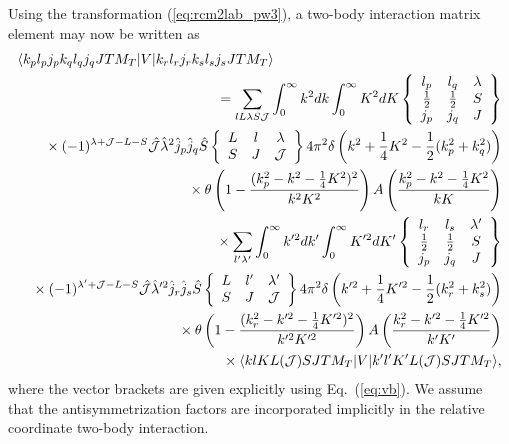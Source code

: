 \documentclass[a4paper,12pt]{report}
\begin{document}
Using the transformation (\ref{eq:rcm2lab_pw3}), a 
two-body interaction matrix element may now be written
as 
\begin{eqnarray} \label{eq:int_v_relcm2lab}
  \lefteqn{  \langle k_{p}l_{p}j_{p}k_{q}l_{q}j_{q}JTM_{T}|
  V|k_{r}l_{r}j_{r}k_{s}l_{s}j_{s}JTM_{T}\rangle } \nonumber \\
  & & {} =\sum_{l L \lambda S \mathcal{J}}\int_{0}^{\infty } k^{2}dk 
  \int_{0}^{\infty } K^{2}dK 
  \left\{ \begin{array}{ccc}
    l_{p} & l_{q} & \lambda \\
    \frac{1}{2} & \frac{1}{2} & S \\
    j_{p} & j_{q} & J 
  \end{array} \right\} \nonumber \\
  & & {} \times (-1)^{\lambda +\mathcal{J}-L-S}
  \hat{\mathcal{J}}\hat{\lambda }^{2}\hat{j}_{p}
  \hat{j}_{q}\hat{S} \left\{ 
  \begin{array}{ccc}
    L & l & \lambda \\
    S & J & \mathcal{J} 
  \end{array} \right\} 
  4\pi^{2}\delta\left( k^{2}+\frac{1}{4}K^{2}
  -\frac{1}{2}(k_{p}^{2}+k_{q}^{2})\right) \nonumber \\
  & & {} \times \theta \left( 1-\frac{(k_{p}^{2}-k^{2}
    -\frac{1}{4}K^{2})^{2}}{k^{2}K^{2}}\right)A
  \left( \frac{k_{p}^{2}-k^{2}-\frac{1}{4}K^{2}}{kK}\right) 
  \nonumber \\
  & & {} \times \sum_{l' \lambda' }\int_{0}^{\infty } 
  k'^{2}dk' \int_{0}^{\infty } K'^{2}dK' 
  \left\{ \begin{array}{ccc}
    l_{r} & l_{s} & \lambda ' \\
    \frac{1}{2} & \frac{1}{2} & S \\
    j_{p} & j_{q} & J 
  \end{array} \right\} \nonumber \\
    & & {} \times (-1)^{\lambda' +\mathcal{J}-L-S}
  \hat{\mathcal{J}}\hat{\lambda }'^{2}\hat{j}_{r}
  \hat{j}_{s}\hat{S} 
  \left\{ \begin{array}{ccc}
    L & l' & \lambda' \\
    S & J & \mathcal{J} 
  \end{array} \right\} 4\pi^{2}\delta 
  \left( k'^{2}+\frac{1}{4}K'^{2}
  -\frac{1}{2}(k_{r}^{2}+k_{s}^{2})\right) \nonumber \\
  & & {} \times \theta \left( 1-\frac{(k_{r}^{2}-k'^{2}
    -\frac{1}{4}K'^{2})^{2}}{k'^{2}K'^{2}}\right) A
  \left( \frac{k_{r}^{2}-k'^{2}-\frac{1}{4}K'^{2}}{k'K'}\right) 
  \nonumber \\
  & & {} \times \langle klKL(\mathcal{J})SJTM_{T}|V
  |k'l'K'L(\mathcal{J})SJTM_{T}\rangle ,
\end{eqnarray}
where the vector brackets are given explicitly using
Eq.~(\ref{eq:vb}). We assume that the antisymmetrization 
factors are incorporated implicitly in the relative 
coordinate two-body interaction. 
\end{document}

